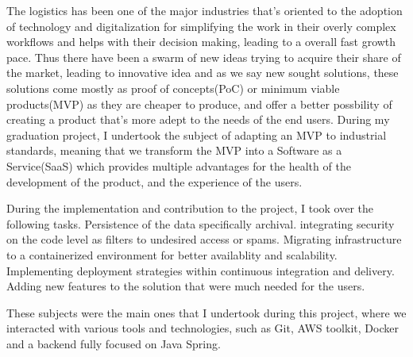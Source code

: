 The logistics has been one of the major industries that's oriented to the
adoption of technology and digitalization for simplifying the work in their overly
complex workflows and helps with their decision making, leading to a overall fast
growth pace. Thus there have been a swarm of new ideas trying to acquire their
share of the market, leading to innovative idea and as we say new sought
solutions, these solutions come mostly as proof of concepts(PoC) or minimum viable products(MVP) as they are cheaper
to produce, and offer a better possbility of creating a product that's more adept to the
needs of the end users. During my graduation project, I undertook the subject of adapting
an MVP to industrial standards, meaning that we transform the MVP into a Software as a
Service(SaaS) which provides multiple advantages for the health of the development of the
product, and the experience of the users.

During the implementation and contribution to the project, I took over the following
tasks.
Persistence of the data specifically archival.
integrating security on the code level as filters to undesired access or spams.
Migrating infrastructure to a containerized environment for better availablity and
scalability.
Implementing deployment strategies within continuous integration and delivery.
Adding new features to the solution that were much needed for the users.

These subjects were the main ones that I undertook during this project, where
we interacted with various tools and technologies, such as Git, AWS toolkit, Docker and
a backend fully focused on Java Spring.

